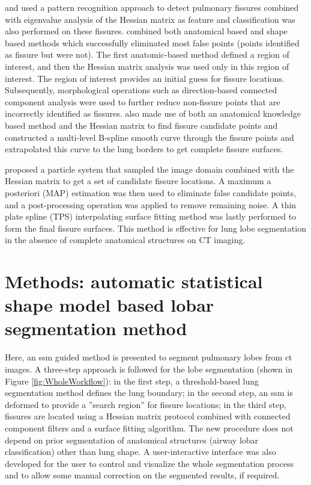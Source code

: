 \cite{ochs2007automated} and \cite{van2008supervised} used a pattern recognition approach to detect pulmonary fissures combined with eigenvalue analysis of the Hessian matrix as feature and classification was also performed on these fissures. \cite{lassen2011interactive,lassen2013automatic} combined both anatomical based and shape based methods which successfully eliminated most false points (points identified as fissure but were not). The first anatomic-based method defined a region of interest, and then the Hessian matrix analysis was used only in this region of interest. The region of interest provides an initial guess for fissure locations. Subsequently, morphological operations such as direction-based connected component analysis were used to further reduce non-fissure points that are incorrectly identified as fissures. \cite{doel2012pulmonary} also made use of both an anatomical knowledge based method and the Hessian matrix to find fissure candidate points and constructed a multi-level B-spline smooth curve through the fissure points and extrapolated this curve to the lung borders to get complete fissure surfaces.

\cite{ross2010automatic, ross2013pulmonary} proposed a particle system that sampled the image domain combined with the Hessian matrix to get a set of candidate fissure locations. A maximum a posteriori (MAP) estimation was then used to eliminate false candidate points, and a post-processing operation was applied to remove remaining noise. A thin plate spline (TPS) interpolating surface fitting method was lastly performed to form the final fissure surfaces. This method is effective for lung lobe segmentation in the absence of complete anatomical structures on CT imaging.

\section{Methods: automatic statistical shape model based lobar segmentation method} \label{SegmentationMethod}
Here, an \gls{ssm} guided method is presented to segment pulmonary lobes from \gls{ct} images. A three-step approach is followed for the lobe segmentation (shown in Figure \ref{fig:WholeWorkflow}): in the first step, a threshold-based lung segmentation method defines the lung boundary; in the second step, an \gls{ssm} is deformed to provide a ''search region'' for fissure locations; in the third step, fissures are located using a Hessian matrix protocol combined with connected component filters and a surface fitting algorithm. The new procedure does not depend on prior segmentation of anatomical structures (airway lobar classification) other than lung shape. A user-interactive interface was also developed for the user to control and visualize the whole segmentation process and to allow some manual correction on the segmented results, if required.
\newpage

